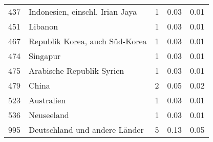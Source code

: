 \begin{longtable}{lXrrr}
        437 & \multicolumn{1}{X}{Indonesien, einschl. Irian Jaya} & %
          \num{1} &
          \num[round-mode=places,round-precision=2]{0.03} &
          \num[round-mode=places,round-precision=2]{0.01} \\

        451 & \multicolumn{1}{X}{Libanon} & %
          \num{1} &
          \num[round-mode=places,round-precision=2]{0.03} &
          \num[round-mode=places,round-precision=2]{0.01} \\

        467 & \multicolumn{1}{X}{Republik Korea, auch Süd-Korea} & %
          \num{1} &
          \num[round-mode=places,round-precision=2]{0.03} &
          \num[round-mode=places,round-precision=2]{0.01} \\

        474 & \multicolumn{1}{X}{Singapur} & %
          \num{1} &
          \num[round-mode=places,round-precision=2]{0.03} &
          \num[round-mode=places,round-precision=2]{0.01} \\

        475 & \multicolumn{1}{X}{Arabische Republik Syrien} & %
          \num{1} &
          \num[round-mode=places,round-precision=2]{0.03} &
          \num[round-mode=places,round-precision=2]{0.01} \\

        479 & \multicolumn{1}{X}{China} & %
          \num{2} &
          \num[round-mode=places,round-precision=2]{0.05} &
          \num[round-mode=places,round-precision=2]{0.02} \\

        523 & \multicolumn{1}{X}{Australien} & %
          \num{1} &
          \num[round-mode=places,round-precision=2]{0.03} &
          \num[round-mode=places,round-precision=2]{0.01} \\

        536 & \multicolumn{1}{X}{Neuseeland} & %
          \num{1} &
          \num[round-mode=places,round-precision=2]{0.03} &
          \num[round-mode=places,round-precision=2]{0.01} \\

        995 & \multicolumn{1}{X}{Deutschland und andere Länder} & %
          \num{5} &
          \num[round-mode=places,round-precision=2]{0.13} &
          \num[round-mode=places,round-precision=2]{0.05} \\


\end{longtable}
